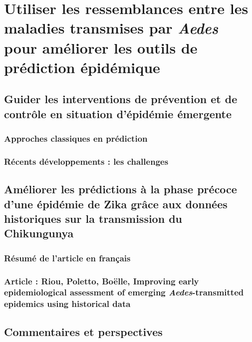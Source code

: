 \chapter{Utiliser les ressemblances entre les maladies transmises par {\em Aedes} pour améliorer les outils de prédiction épidémique}

\section{Guider les interventions de prévention et de contrôle en situation d'épidémie émergente}

\subsection{Approches classiques en prédiction}

\subsection{Récents développements : les challenges}

\section{Améliorer les prédictions à la phase précoce d'une épidémie de Zika grâce aux données historiques sur la transmission du Chikungunya}

\subsection{Résumé de l'article en français}

\subsection{Article : Riou, Poletto, Boëlle, Improving early epidemiological assessment of emerging {\em Aedes}-transmitted epidemics using historical data}

%

\section{Commentaires et perspectives}
\sectionmark{ }
